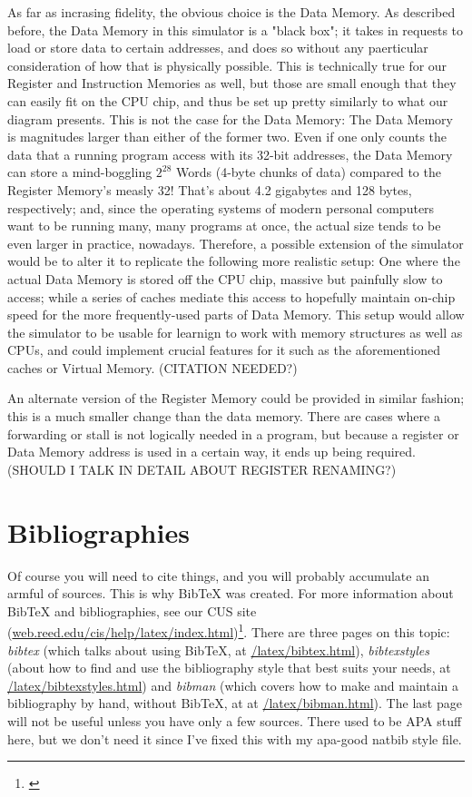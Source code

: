\documentclass[12pt,twoside]{reedthesis}
\begin{document}
As far as incrasing fidelity, the obvious choice is the Data Memory. As described before, the Data Memory in this simulator is a "black box"; it takes in requests to load or store data to certain addresses, and does so without any paerticular consideration of how that is physically possible. This is technically true for our Register and Instruction Memories as well, but those are small enough that they can easily fit on the CPU chip, and thus be set up pretty similarly to what our diagram presents. This is not the case for the Data Memory: The Data Memory is magnitudes larger than either of the former two. Even if one only counts the data that a running program access with its 32-bit addresses, the Data Memory can store a mind-boggling $2^28$ Words (4-byte chunks of data) compared to the Register Memory's measly 32! That's about 4.2 gigabytes and 128 bytes, respectively; and, since the operating systems of modern personal computers want to be running many, many programs at once, the actual size tends to be even larger in practice, nowadays. Therefore, a possible extension of the simulator would be to alter it to replicate the following more realistic setup: One where the actual Data Memory is stored off the CPU chip, massive but painfully slow to access; while a series of caches mediate this access to hopefully maintain on-chip speed for the more frequently-used parts of Data Memory. This setup would allow the simulator to be usable for learnign to work with memory structures as well as CPUs, and could implement crucial features for it such as the aforementioned caches or Virtual Memory.
(CITATION NEEDED?)

An alternate version of the Register Memory could be provided in similar fashion; this is a much smaller change than the data memory. There are cases where a forwarding or stall is not logically needed in a program, but because a register or Data Memory address is used in a certain way, it ends up being required. (SHOULD I TALK IN DETAIL ABOUT REGISTER RENAMING?)




\section{Bibliographies}
Of course you will need to cite things, and you will probably accumulate an armful of sources. This is why BibTeX was created. For more information about BibTeX and bibliographies, see our CUS site (\url{web.reed.edu/cis/help/latex/index.html})\footnote{\cite{reedweb:2007}}. There are three pages on this topic: {\it bibtex} (which talks about using BibTeX, at \url{/latex/bibtex.html}), {\it bibtexstyles} (about how to find and use the bibliography style that best suits your needs, at \url{/latex/bibtexstyles.html}) and {\it bibman} (which covers how to make and maintain a bibliography by hand, without BibTeX, at at \url{/latex/bibman.html}). The last page will not be useful unless you have only a few sources. There used to be APA stuff here, but we don't need it since I've fixed this with my apa-good natbib style file.
\end{document}

